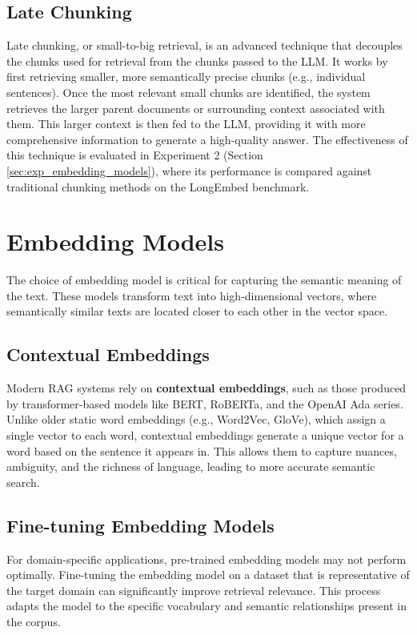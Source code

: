 \subsection{Late Chunking}
Late chunking, or small-to-big retrieval, is an advanced technique that decouples the chunks used for retrieval from the chunks passed to the LLM. It works by first retrieving smaller, more semantically precise chunks (e.g., individual sentences). Once the most relevant small chunks are identified, the system retrieves the larger parent documents or surrounding context associated with them. This larger context is then fed to the LLM, providing it with more comprehensive information to generate a high-quality answer. The effectiveness of this technique is evaluated in Experiment 2 (Section \ref{sec:exp_embedding_models}), where its performance is compared against traditional chunking methods on the LongEmbed benchmark.

\section{Embedding Models}
The choice of embedding model is critical for capturing the semantic meaning of the text. These models transform text into high-dimensional vectors, where semantically similar texts are located closer to each other in the vector space.

\subsection{Contextual Embeddings}
Modern RAG systems rely on \textbf{contextual embeddings}, such as those produced by transformer-based models like BERT, RoBERTa, and the OpenAI Ada series. Unlike older static word embeddings (e.g., Word2Vec, GloVe), which assign a single vector to each word, contextual embeddings generate a unique vector for a word based on the sentence it appears in. This allows them to capture nuances, ambiguity, and the richness of language, leading to more accurate semantic search.

\subsection{Fine-tuning Embedding Models}
For domain-specific applications, pre-trained embedding models may not perform optimally. Fine-tuning the embedding model on a dataset that is representative of the target domain can significantly improve retrieval relevance. This process adapts the model to the specific vocabulary and semantic relationships present in the corpus.

